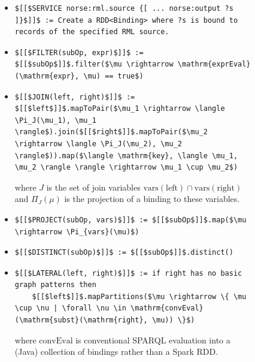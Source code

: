 \begin{figure}[htb]
\begin{itemize}
\setlength\itemsep{-0.5em}
\item \begin{lstlisting}[mathescape=true]
$[[$SERVICE norse:rml.source {[ ... norse:output ?s ]}$]]$ := Create a RDD<Binding> where ?s is bound to records of the specified RML source.
\end{lstlisting}

\item \begin{lstlisting}[mathescape=true]
$[[$FILTER(subOp, expr)$]]$ := $[[$subOp$]]$.filter($\mu \rightarrow \mathrm{exprEval}(\mathrm{expr}, \mu) == true$)
\end{lstlisting}

\item \begin{lstlisting}[mathescape=true]
$[[$JOIN(left, right)$]]$ := $[[$left$]]$.mapToPair($\mu_1 \rightarrow \langle \Pi_J(\mu_1), \mu_1 \rangle$).join($[[$right$]]$.mapToPair($\mu_2 \rightarrow \langle \Pi_J(\mu_2), \mu_2 \rangle$)).map($\langle \mathrm{key}, \langle \mu_1, \mu_2 \rangle \rangle \rightarrow \mu_1 \cup \mu_2$)
\end{lstlisting}
where $J$ is the set of join variables $\mathrm{vars}(\mathrm{left}) \cap \mathrm{vars}(\mathrm{right})$ and $\Pi_J(\mu)$ is the projection of a binding to these variables.

\item \begin{lstlisting}[mathescape=true]
$[[$PROJECT(subOp, vars)$]]$ := $[[$subOp$]]$.map($\mu \rightarrow \Pi_{vars}(\mu)$)
\end{lstlisting}

\item \begin{lstlisting}[mathescape=true]
$[[$DISTINCT(subOp)$]]$ := $[[$subOp$]]$.distinct()
\end{lstlisting}

\item \begin{lstlisting}[mathescape=true]
$[[$LATERAL(left, right)$]]$ := if right has no basic graph patterns then
    $[[$left$]]$.mapPartitions($\mu \rightarrow \{ \mu \cup \nu | \forall \nu \in \mathrm{convEval}(\mathrm{subst}(\mathrm{right}, \mu)) \}$)
\end{lstlisting}
where $\mathrm{convEval}$ is conventional SPARQL evaluation into a (Java) collection of bindings rather than a Spark RDD.


\end{itemize}
\end{figure}
